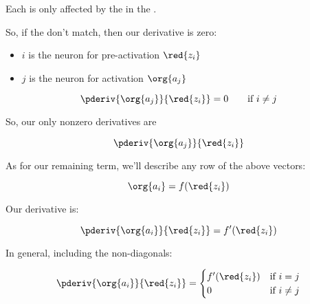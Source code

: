         \begin{concept}
            Each  is only affected by the  in the . 
            
            So, if the  don't match, then our derivative is zero:
            
            \begin{itemize}
                \item $i$ is the neuron for pre-activation $\red{z_i}$
                \item $j$ is the neuron for activation $\org{a_j}$
            \end{itemize}
            
            \begin{equation*}
                \pderiv { \org{a_j} }   { \red{z_i} } = 0
                \qquad
                \text{if } i \neq j
            \end{equation*}
            
            So, our only nonzero derivatives are
            
            \begin{equation*}
                \pderiv { \org{a_j} }   { \red{z_i} }
            \end{equation*}
            
        \end{concept}
        
        As for our remaining term, we'll describe any row of the above vectors:
        
        \begin{equation}
            \org{a_i} = f(\red{z_i})
        \end{equation}
        
        Our derivative is:
        
        \begin{equation}
            \pderiv { \org{a_i} }{ \red{z_i} }  = f'(\red{z_i})
        \end{equation}
        
        In general, including the non-diagonals:
        
        \begin{equation}
            \pderiv { \org{a_i} }{ \red{z_i} }
            = 
            \begin{cases}
              f'(\red{z_i}) & \text{if } i = j\\
              0 & \text{if } i \neq j
            \end{cases}
        \end{equation}
        
